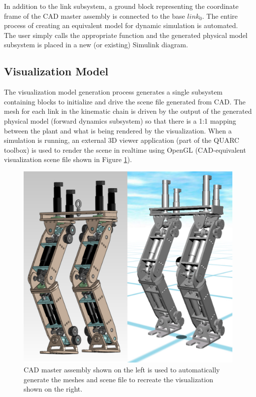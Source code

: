 In addition to the link subsystem, a ground block representing the coordinate frame of the CAD master assembly is connected to the base $link_{0}$. The entire process of creating an equivalent model for dynamic simulation is automated. The user simply calls the appropriate function and the generated physical model subsystem is placed in a new (or existing) Simulink diagram.

\subsection{Visualization Model} %
\label{sub:visualization_model}
The visualization model generation process generates a single subsystem containing blocks to initialize and drive the scene file generated from CAD. The mesh for each link in the kinematic chain is driven by the output of the generated physical model (forward dynamics subsystem) so that there is a 1:1 mapping between the plant and what is being rendered by the visualization. When a simulation is running, an external 3D viewer application (part of the QUARC toolbox) is used to render the scene in realtime using OpenGL (CAD-equivalent visualization scene file shown in Figure \ref{fig:masterscene}).

\begin{figure}[!h]
	\centering
    \includegraphics[scale=0.50]{fig/toolchain/masterscene.pdf}
  	\caption{CAD master assembly shown on the left is used to automatically generate the meshes and scene file to recreate the visualization shown on the right.}
	\label{fig:masterscene}
\end{figure}

